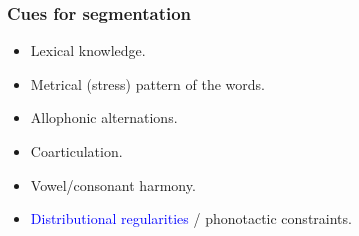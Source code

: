 \begin{frame}
\frametitle{Cues for segmentation}
\begin{itemize}
\item Lexical knowledge.
\item Metrical (stress) pattern of the words.
\item Allophonic alternations.
\item Coarticulation.
\item Vowel/consonant harmony.
\item \textcolor<2->{blue}{Distributional regularities} / phonotactic constraints.
\end{itemize}
\end{frame}
